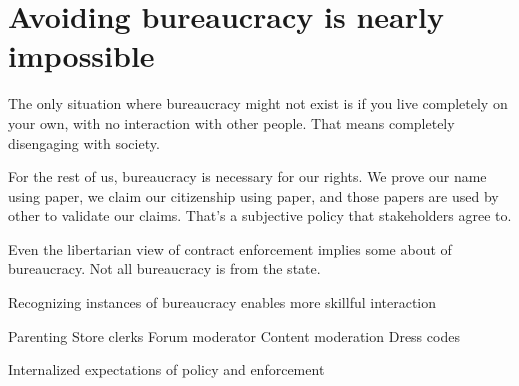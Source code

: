 \section{Avoiding bureaucracy is nearly impossible}

The only situation where bureaucracy might not exist is if you live completely on your own, with no interaction with other people. That means completely disengaging with society. 

For the rest of us, bureaucracy is necessary for our rights. We prove our name using paper, we claim our citizenship using paper, and those papers are used by other to validate our claims. That's a subjective policy that stakeholders agree to. 

Even the libertarian view of contract enforcement implies some about of bureaucracy. Not all bureaucracy is from the state. 

Recognizing instances of bureaucracy enables more skillful interaction


Parenting
Store clerks
Forum moderator
Content moderation
Dress codes


Internalized expectations of policy and enforcement